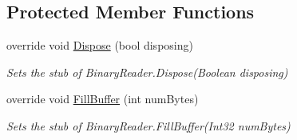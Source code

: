 \subsection*{Protected Member Functions}
\begin{DoxyCompactItemize}
\item 
override void \hyperlink{class_system_1_1_i_o_1_1_fakes_1_1_stub_binary_reader_a8988c2d21daf2ac4b6406aeeafc808e3}{Dispose} (bool disposing)
\begin{DoxyCompactList}\small\item\em Sets the stub of Binary\-Reader.\-Dispose(\-Boolean disposing)\end{DoxyCompactList}\item 
override void \hyperlink{class_system_1_1_i_o_1_1_fakes_1_1_stub_binary_reader_a8a6a8f4e771e236c6468cd25edd230e9}{Fill\-Buffer} (int num\-Bytes)
\begin{DoxyCompactList}\small\item\em Sets the stub of Binary\-Reader.\-Fill\-Buffer(\-Int32 num\-Bytes)\end{DoxyCompactList}\end{DoxyCompactItemize}
